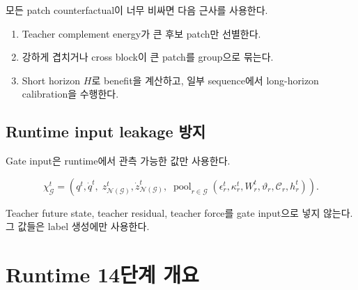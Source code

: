 \documentclass[11pt,a4paper]{article}
\begin{document}
모든 patch counterfactual이 너무 비싸면 다음 근사를 사용한다.

\begin{enumerate}[leftmargin=1.7em]
  \item Teacher complement energy가 큰 후보 patch만 선별한다.
  \item 강하게 겹치거나 cross block이 큰 patch를 group으로 묶는다.
  \item Short horizon \(H\)로 benefit을 계산하고,
  일부 sequence에서 long-horizon calibration을 수행한다.
\end{enumerate}

\subsection{Runtime input leakage 방지}

Gate input은 runtime에서 관측 가능한 값만 사용한다.

\begin{equation}
  \chi_{\mathcal G}^t
  =
  \left(
  q^t,\dot q^t,\;
  z_{\mathcal N(\mathcal G)}^t,\dot z_{\mathcal N(\mathcal G)}^t,\;
  \operatorname{pool}_{r\in\mathcal G}
  (\epsilon_r^t,\kappa_r^t,W_r^t,\vartheta_r,\mathcal C_r,h_r^t)
  \right).
\end{equation}

Teacher future state, teacher residual, teacher force를 gate input으로 넣지 않는다.
그 값들은 label 생성에만 사용한다.

\section{Runtime 14단계 개요}
\end{document}
